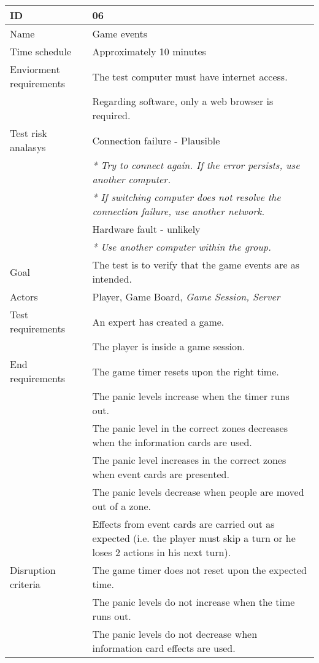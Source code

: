 {\footnotesize
\begin{longtable}[l]{| p{5cm} | p{10cm} |}\hline
	\textbf{ID}	& \textbf{06} \\ \hline
	Name		& Game events\\ \hline
	Time schedule	& Approximately 10 minutes\\ \hline
	Enviorment requirements 
		& The test computer must have internet access. \\
		& Regarding software, only a web browser is required. \\ \hline
	Test risk analasys 
		& Connection failure - Plausible \\
		& \emph{* Try to connect again. If the error persists, use another computer.} \\
		& \emph{* If switching computer does not resolve the connection failure, use another network.}\\ 
		& Hardware fault - unlikely \\
		& \emph{* Use another computer within the group.} \\ \hline
	Goal	& The test is to verify that the game events are as intended. \\ \hline
	Actors	& Player, Game Board, \emph{Game Session, Server}\\ \hline
	Test requirements
		& An expert has created a game. \\
		& The player is inside a game session. \\ \hline
	End requirements 
		& The game timer resets upon the right time.\\
		& The panic levels increase when the timer runs out.\\
		& The panic level in the correct zones decreases when the information cards are used.\\
		& The panic level increases in the correct zones when event cards are presented.\\
		& The panic levels decrease when people are moved out of a zone.\\
		& Effects from event cards are carried out as expected (i.e. the player must 
			skip a turn or he loses 2 actions in his next turn). \\ \hline
	Disruption criteria 
		& The game timer does not reset upon the expected time.\\
		& The panic levels do not increase when the time runs out.\\
		& The panic levels do not decrease when information card effects are used.\\

\end{longtable}}
